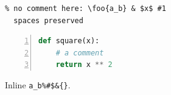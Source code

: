 \documentclass{article}
\begin{document}
\begin{verbatim}
% no comment here: \foo{a_b} & $x$ #1
  spaces preserved
\end{verbatim}
\begin{lstlisting}[language=Python,numbers=left,frame=single]
def square(x):
    # a comment
    return x ** 2
\end{lstlisting}
Inline \verb|a_b%#$&{}|.
\end{document}
